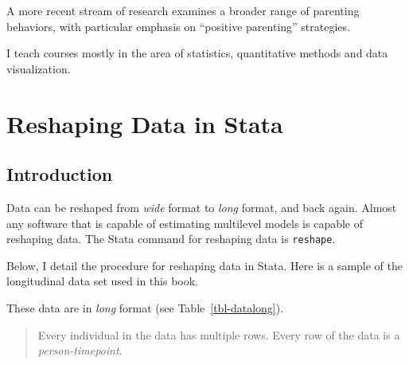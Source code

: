 \documentclass[
  letterpaper,
  DIV=11,
  numbers=noendperiod]{scrreprt}
\begin{document}
A more recent stream of research examines a broader range of parenting
behaviors, with particular emphasis on ``positive parenting''
strategies.

I teach courses mostly in the area of statistics, quantitative methods
and data visualization.

\cleardoublepage
{}
{}
\appendix

\chapter{Reshaping Data in Stata}\label{sec-reshape}

\section{Introduction}\label{introduction-2}

Data can be reshaped from \emph{wide} format to \emph{long} format, and
back again. Almost any software that is capable of estimating multilevel
models is capable of reshaping data. The Stata command for reshaping
data is \texttt{reshape}.

Below, I detail the procedure for reshaping data in Stata. Here is a
sample of the longitudinal data set used in this book.

These data are in \emph{long} format (see Table~\ref{tbl-datalong}).

\begin{quote}
Every individual in the data has multiple rows. Every row of the data is
a \emph{person-timepoint}.
\end{quote}
\end{document}
